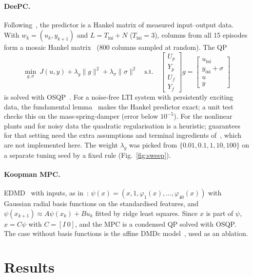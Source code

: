 \documentclass[11pt,a4paper]{article}
\begin{document}
\paragraph{DeePC.} Following~\cite{coulson2019deepc}, the predictor is a
Hankel matrix of measured input--output data. With $w_k=(u_k,y_{k+1})$ and
$L = T_{\mathrm{ini}}+N$ ($T_{\mathrm{ini}}=3$), columns from all 15 episodes
form a mosaic Hankel matrix~\cite{vanwaarde2020lemma} (800 columns sampled at
random). The QP
\begin{equation}
\min_{g,\sigma}\ J(u,y) + \lambda_g\|g\|^2 + \lambda_\sigma\|\sigma\|^2
\quad\text{s.t.}\quad
\begin{bmatrix}U_p\\Y_p\\U_f\\Y_f\end{bmatrix} g =
\begin{bmatrix}u_{\mathrm{ini}}\\y_{\mathrm{ini}}+\sigma\\u\\y\end{bmatrix}
\end{equation}
is solved with OSQP~\cite{stellato2020osqp}. For a noise-free LTI system with
persistently exciting data, the fundamental lemma~\cite{willems2005note} makes
the Hankel predictor exact; a unit test checks this on the mass-spring-damper
(error below $10^{-5}$). For the nonlinear plants and for noisy data the
quadratic regularisation is a heuristic; guarantees for that setting need the
extra assumptions and terminal ingredients of~\cite{berberich2021datadriven},
which are not implemented here. The weight $\lambda_g$ was picked from
$\{0.01,0.1,1,10,100\}$ on a separate tuning seed by a fixed rule
(Fig.~\ref{fig:sweep}).

\paragraph{Koopman MPC.} EDMD~\cite{williams2015edmd} with inputs, as
in~\cite{korda2018linear}: $\psi(x) = (x, 1, \varphi_1(x),\dots,\varphi_{40}(x))$
with Gaussian radial basis functions on the standardised features, and
$\psi(x_{k+1}) \approx A\psi(x_k) + Bu_k$ fitted by ridge least squares. Since
$x$ is part of $\psi$, $x = C\psi$ with $C=[I\ 0]$, and the MPC is a condensed
QP solved with OSQP. The case without basis functions is the affine DMDc
model~\cite{proctor2016dmdc}, used as an ablation.

\section{Results}
\end{document}
